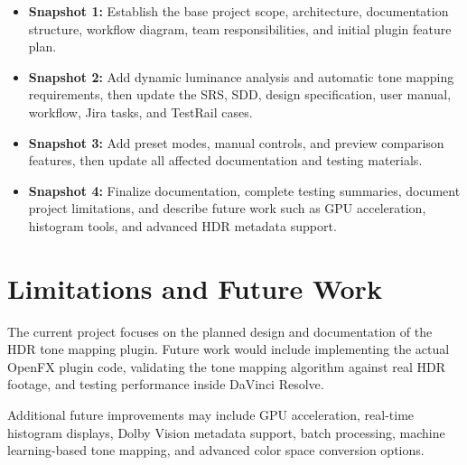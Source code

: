 \documentclass[11pt]{article}
\begin{document}
\begin{itemize}
    \item \textbf{Snapshot 1:} Establish the base project scope, architecture, documentation structure, workflow diagram, team responsibilities, and initial plugin feature plan.
    \item \textbf{Snapshot 2:} Add dynamic luminance analysis and automatic tone mapping requirements, then update the SRS, SDD, design specification, user manual, workflow, Jira tasks, and TestRail cases.
    \item \textbf{Snapshot 3:} Add preset modes, manual controls, and preview comparison features, then update all affected documentation and testing materials.
    \item \textbf{Snapshot 4:} Finalize documentation, complete testing summaries, document project limitations, and describe future work such as GPU acceleration, histogram tools, and advanced HDR metadata support.
\end{itemize}


\section{Limitations and Future Work}

The current project focuses on the planned design and documentation of the HDR tone mapping plugin. Future work would include implementing the actual OpenFX plugin code, validating the tone mapping algorithm against real HDR footage, and testing performance inside DaVinci Resolve.

Additional future improvements may include GPU acceleration, real-time histogram displays, Dolby Vision metadata support, batch processing, machine learning-based tone mapping, and advanced color space conversion options.

\end{document}
